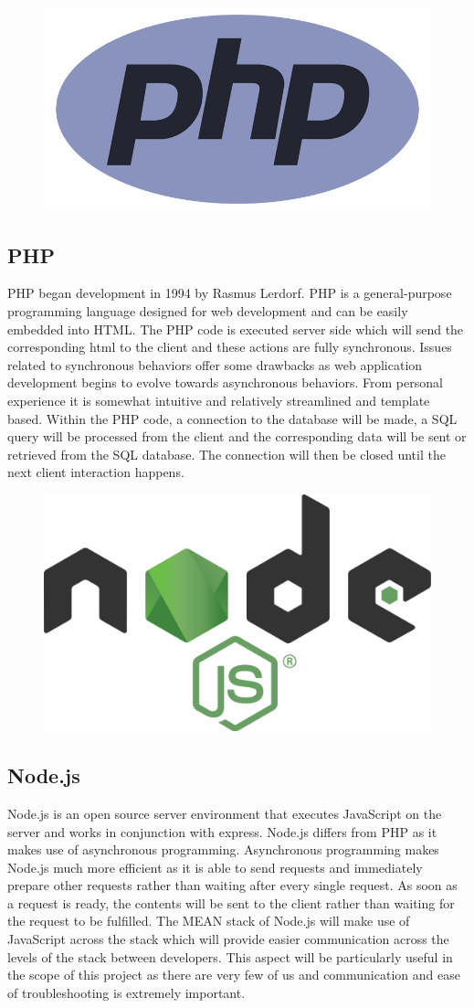 \documentclass[12pt]{article}
\begin{document}
\begin{figure}[h]
	\centering
	\includegraphics[width=0.251\linewidth]{php}
\end{figure}

\subsection{PHP}

PHP began development in 1994 by Rasmus Lerdorf.\cite{php}  PHP is a general-purpose programming language designed for web development and can be easily embedded into HTML.  The PHP code is executed server side which will send the corresponding html to the client and these actions are fully synchronous.  Issues related to synchronous behaviors offer some drawbacks as web application development begins to evolve towards asynchronous behaviors.  From personal experience it is somewhat intuitive and relatively streamlined and template based.  Within the PHP code, a connection to the database will be made, a SQL query will be processed from the client and the corresponding data will be sent or retrieved from the SQL database.  The connection will then be closed until the next client interaction happens.

\begin{figure}[h]
	\centering
	\includegraphics[width=0.251\linewidth]{nodejs}
\end{figure}

\subsection{Node.js}

Node.js is an open source server environment that executes JavaScript on the server and works in conjunction with express.  Node.js differs from PHP as it makes use of asynchronous programming.  Asynchronous programming makes Node.js much more efficient as it is able to send requests and immediately prepare other requests rather than waiting after every single request.\cite{node}  As soon as a request is ready, the contents will be sent to the client rather than waiting for the request to be fulfilled.  The MEAN stack of Node.js will make use of JavaScript across the stack which will provide easier communication across the levels of the stack between developers.  This aspect will be particularly useful in the scope of this project as there are very few of us and communication and ease of troubleshooting is extremely important.
\end{document}
